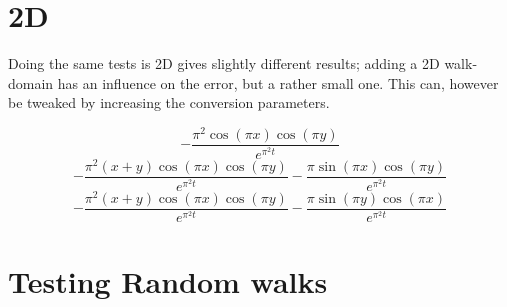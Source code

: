 \section{2D}
Doing the same tests is 2D gives slightly different results; adding a 2D walk-domain has an influence on the error, but a rather small one. 
This can, however be tweaked by increasing the conversion parameters.

\begin{equation}
 - \frac{\pi^{2} \operatorname{cos}\left(\pi x\right) \operatorname{cos}\left(\pi y\right)}{e^{\pi^{2} t}}
\end{equation}
\begin{equation}
- \frac{\pi^{2} \left(x + y\right) \operatorname{cos}\left(\pi x\right) \operatorname{cos}\left(\pi y\right)}{e^{\pi^{2} t}} - \frac{\pi \operatorname{sin}\left(\pi x\right) \operatorname{cos}\left(\pi y\right)}{e^{\pi^{2} t}}
\end{equation}
\begin{equation}
- \frac{\pi^{2} \left(x + y\right) \operatorname{cos}\left(\pi x\right) \operatorname{cos}\left(\pi y\right)}{e^{\pi^{2} t}} - \frac{\pi \operatorname{sin}\left(\pi y\right) \operatorname{cos}\left(\pi x\right)}{e^{\pi^{2} t}}
\end{equation}


\section{Testing Random walks}\label{testing_random_walks}

